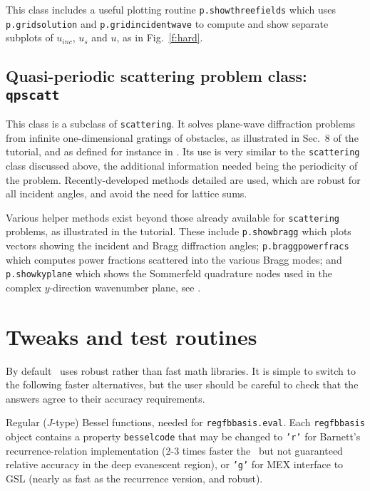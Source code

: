 \documentclass[12pt]{article}
\begin{document}
This class includes a useful plotting routine
{\tt p.showthreefields} which uses {\tt p.gridsolution} and
{\tt p.gridincidentwave} to compute and show separate subplots of
$u_{inc}$, $u_s$ and $u$, as in Fig.~\ref{f:hard}.



\subsection{Quasi-periodic scattering problem class: {\tt qpscatt}}

This class is a subclass of {\tt scattering}.
It solves plane-wave diffraction problems from infinite one-dimensional
gratings of obstacles, as illustrated in Sec.~8 of the tutorial,
and as defined for instance in \cite{linton07}.
Its use is very similar to the {\tt scattering} class discussed above,
the additional information needed being the periodicity of the problem.
Recently-developed methods detailed \cite{qpsc} are used,
which are robust for all incident angles, and avoid the need for lattice sums.

Various helper methods exist beyond those already available for
{\tt scattering} problems, as illustrated in the tutorial.
These include
{\tt p.showbragg} which plots vectors showing the incident and Bragg
diffraction angles; {\tt p.braggpowerfracs} which computes
power fractions scattered into the various Bragg modes;
and {\tt p.showkyplane} which shows the Sommerfeld quadrature
nodes used in the complex $y$-direction wavenumber plane, see \cite{qpsc}.


\section{Tweaks and test routines}
\label{s:tweak}

By default \mpspack\ uses robust rather than fast math libraries.
It is simple to switch to the following
faster alternatives, but the user should be careful
to check that the answers agree to their accuracy requirements.
\ben
\item Regular ($J$-type) Bessel functions, needed for {\tt regfbbasis.eval}.
Each {\tt regfbbasis} object contains a property {\tt besselcode}
that may be changed to {\tt 'r'} for Barnett's recurrence-relation
implementation (2-3 times faster the \matlab\ but
not guaranteed relative accuracy in
the deep evanescent region),
or {\tt 'g'} for MEX interface to GSL (nearly as fast as the recurrence
version, and robust).
\end{document}
